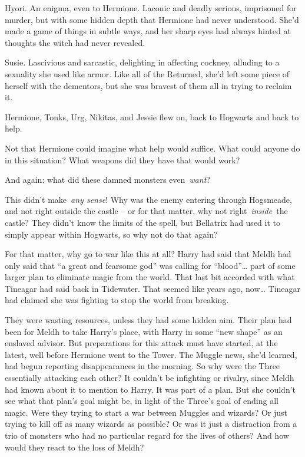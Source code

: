 Hyori. An enigma, even to Hermione. Laconic and deadly serious,
imprisoned for murder, but with some hidden depth that Hermione had
never understood. She'd made a game of things in subtle ways, and her
sharp eyes had always hinted at thoughts the witch had never revealed.

Susie. Lascivious and sarcastic, delighting in affecting cockney,
alluding to a sexuality she used like armor. Like all of the Returned,
she'd left some piece of herself with the dementors, but she was bravest
of them all in trying to reclaim it.

Hermione, Tonks, Urg, Nikitas, and Jessie flew on, back to Hogwarts and
back to help.

Not that Hermione could imagine what help would suffice. What could
anyone do in this situation? What weapons did they have that would work?

And again: what did these damned monsters even~\emph{want}?

This didn't make~\emph{any sense}! Why was the enemy entering through
Hogsmeade, and not right outside the castle -- or for that matter, why
not right~\emph{inside}~the castle? They didn't know the limits of the
spell, but Bellatrix had used it to simply appear within Hogwarts, so
why not do that again?

For that matter, why go to war like this at all? Harry had said that
Meldh had only said that ``a great and fearsome god'' was calling for
``blood''\ldots{} part of some larger plan to eliminate magic from the
world. That last bit accorded with what Tineagar had said back in
Tidewater. That seemed like years ago, now\ldots{} Tineagar had claimed
she was fighting to stop the world from breaking.

They were wasting resources, unless they had some hidden aim. Their plan
had been for Meldh to take Harry's place, with Harry in some ``new
shape'' as an enslaved advisor. But preparations for this attack must
have started, at the latest, well before Hermione went to the Tower. The
Muggle news, she'd learned, had begun reporting disappearances in the
morning. So why were the Three essentially attacking each other? It
couldn't be infighting or rivalry, since Meldh had known about it to
mention to Harry. It was part of a plan. But she couldn't see what that
plan's goal might be, in light of the Three's goal of ending all magic.
Were they trying to start a war between Muggles and wizards? Or just
trying to kill off as many wizards as possible? Or was it just a
distraction from a trio of monsters who had no particular regard for the
lives of others? And how would they react to the loss of Meldh?

